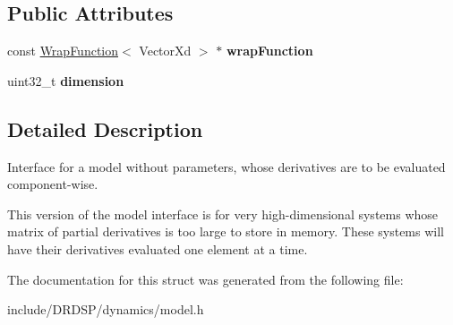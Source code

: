 \subsection*{Public Attributes}
\begin{DoxyCompactItemize}
\item 
\hypertarget{struct_d_r_d_s_p_1_1_model_c_w_ae05ac52c41fef18a0285344ba7a795fb}{const \hyperlink{struct_d_r_d_s_p_1_1_wrap_function}{Wrap\-Function}$<$ Vector\-Xd $>$ $\ast$ {\bfseries wrap\-Function}}\label{struct_d_r_d_s_p_1_1_model_c_w_ae05ac52c41fef18a0285344ba7a795fb}

\item 
\hypertarget{struct_d_r_d_s_p_1_1_model_c_w_adf7c5e5a8f7e2b277ec6df7df675d582}{uint32\-\_\-t {\bfseries dimension}}\label{struct_d_r_d_s_p_1_1_model_c_w_adf7c5e5a8f7e2b277ec6df7df675d582}

\end{DoxyCompactItemize}


\subsection{Detailed Description}
Interface for a model without parameters, whose derivatives are to be evaluated component-\/wise. 

This version of the model interface is for very high-\/dimensional systems whose matrix of partial derivatives is too large to store in memory. These systems will have their derivatives evaluated one element at a time. 

The documentation for this struct was generated from the following file\-:\begin{DoxyCompactItemize}
\item 
include/\-D\-R\-D\-S\-P/dynamics/model.\-h\end{DoxyCompactItemize}
